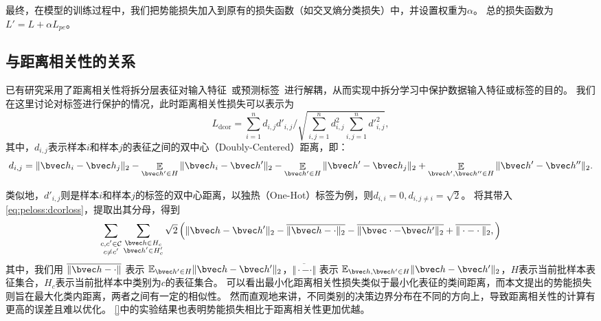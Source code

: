最终，在模型的训练过程中，我们把势能损失加入到原有的损失函数（如交叉熵分类损失）中，并设置权重为$\alpha$。
总的损失函数为$L' = L + \alpha L_{pe}$。

\subsection{与距离相关性的关系}
已有研究采用了距离相关性将拆分层表征对输入特征~\cite{vepakomma2020nopeek}或预测标签~\cite{sunjiankai2022forward_embedding_protect}进行解耦，从而实现中拆分学习中保护数据输入特征或标签的目的。
%
我们在这里讨论对标签进行保护的情况，此时距离相关性损失可以表示为
\begin{equation}
\label{eq:peloss:dcorloss}
    L_\text{dcor} = \sum_{i=1}^n d_{i,j} d'_{i, j} \Big/ \sqrt{\sum_{i,j=1}^n d_{i, j}^2 \sum_{i,j=1}^n {d'}_{i, j}^2},
\end{equation}
%
其中，$d_{i,j}$表示样本$i$和样本$j$的表征之间的双中心（Doubly-Centered）距离，即：
\begin{equation}
    d_{i, j} = \Vert \bvec h_i - \bvec h_j \Vert_2 - \mathop{\mathbb E}_{\bvec h'\in H}\Vert \bvec h_i - \bvec h' \Vert_2 - \mathop{\mathbb E}_{\bvec h'\in H}\Vert \bvec h' - \bvec h_j \Vert_2 + \mathop{\mathbb E}_{\bvec h', \bvec h'' \in H}\Vert \bvec h' - \bvec h'' \Vert_2.
\end{equation}

类似地，$d'_{i,j}$则是样本$i$和样本$j$的标签的双中心距离，以独热（One-Hot）标签为例，则$d_{i,i} = 0, d_{i,j\ne i} = \sqrt 2$。
将其带入\autoref{eq:peloss:dcorloss}，提取出其分母，得到
\begin{equation}
    \sum_{\substack{c,c'\in \mathcal C \\ c\ne c'}} \sum_{\substack{\bvec h\in H_c \\ \bvec h' \in H_c'}} \sqrt2 
    \left( 
        \Vert \bvec h - \bvec h'\Vert_2 - \overline{\Vert \bvec h - \cdot \Vert_2} - \overline{\Vert \bvec \cdot - \bvec h' \Vert_2} + \overline{\Vert \cdot - \cdot\Vert_2}, 
    \right)
\end{equation}
其中，我们用 $\overline{\Vert \bvec h - \cdot \Vert}$ 表示 $\mathbb E_{\bvec h'\in H} \Vert \bvec h - \bvec h'\Vert_2$，$\overline{\Vert \cdot - \cdot \Vert}$ 表示 $\mathbb E_{\bvec h, \bvec h'\in H} \Vert \bvec h - \bvec h'\Vert_2$，$H$表示当前批样本表征集合，$H_c$表示当前批样本中类别为$c$的表征集合。
%
可以看出最小化距离相关性损失类似于最小化表征的类间距离，而本文提出的势能损失则旨在最大化类内距离，两者之间有一定的相似性。
%
然而直观地来讲，不同类别的决策边界分布在不同的方向上，导致距离相关性的计算有更高的误差且难以优化。
%
\autoref{}中的实验结果也表明势能损失相比于距离相关性更加优越。


